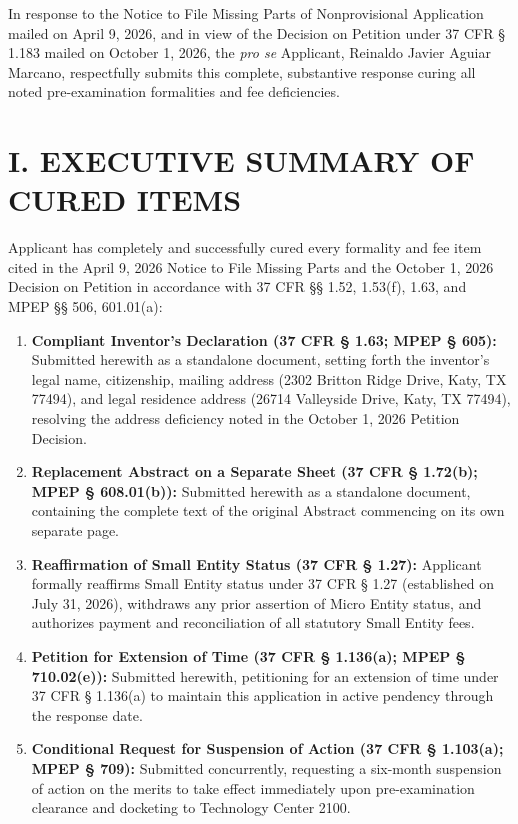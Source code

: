 \documentclass[11pt,letterpaper]{article}
\begin{document}
\noindent In response to the Notice to File Missing Parts of Nonprovisional Application mailed on April 9, 2026, and in view of the Decision on Petition under 37 CFR \S{} 1.183 mailed on October 1, 2026, the \textit{pro se} Applicant, Reinaldo Javier Aguiar Marcano, respectfully submits this complete, substantive response curing all noted pre-examination formalities and fee deficiencies.

\section*{I. EXECUTIVE SUMMARY OF CURED ITEMS}

Applicant has completely and successfully cured every formality and fee item cited in the April 9, 2026 Notice to File Missing Parts and the October 1, 2026 Decision on Petition in accordance with 37 CFR \S\S{} 1.52, 1.53(f), 1.63, and MPEP \S\S{} 506, 601.01(a):

\begin{enumerate}[leftmargin=2em, itemsep=3pt, parsep=0pt]
    \item \textbf{Compliant Inventor's Declaration (37 CFR \S{} 1.63; MPEP \S{} 605):} Submitted herewith as a standalone document, setting forth the inventor's legal name, citizenship, mailing address (2302 Britton Ridge Drive, Katy, TX 77494), and legal residence address (26714 Valleyside Drive, Katy, TX 77494), resolving the address deficiency noted in the October 1, 2026 Petition Decision.
    \item \textbf{Replacement Abstract on a Separate Sheet (37 CFR \S{} 1.72(b); MPEP \S{} 608.01(b)):} Submitted herewith as a standalone document, containing the complete text of the original Abstract commencing on its own separate page.
    \item \textbf{Reaffirmation of Small Entity Status (37 CFR \S{} 1.27):} Applicant formally reaffirms Small Entity status under 37 CFR \S{} 1.27 (established on July 31, 2026), withdraws any prior assertion of Micro Entity status, and authorizes payment and reconciliation of all statutory Small Entity fees.
    \item \textbf{Petition for Extension of Time (37 CFR \S{} 1.136(a); MPEP \S{} 710.02(e)):} Submitted herewith, petitioning for an extension of time under 37 CFR \S{} 1.136(a) to maintain this application in active pendency through the response date.
    \item \textbf{Conditional Request for Suspension of Action (37 CFR \S{} 1.103(a); MPEP \S{} 709):} Submitted concurrently, requesting a six-month suspension of action on the merits to take effect immediately upon pre-examination clearance and docketing to Technology Center 2100.
\end{enumerate}
\end{document}
